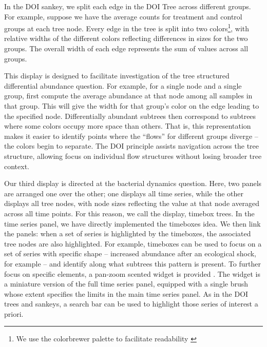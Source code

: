 \documentclass[12pt]{article}
\begin{document}
In the DOI sankey, we split each edge in the DOI Tree across different
groups. For example, suppose we have the average counts for treatment
and control groups at each tree node. Every edge in the tree is split
into two colors\footnote{We use the colorbrewer palette to facilitate
  readability \citep{brewer2003colorbrewer}}, with relative
widths of the different colors reflecting differences in sizes for the
two groups. The overall width of each edge represents the sum of values
across all groups.

This display is designed to facilitate investigation of the tree
structured differential abundance question. For example, for a single
node and a single group, first compute the average abundance at that
node among all samples in that group. This will give the width for that
group's color on the edge leading to the specified node. Differentially
abundant subtrees then correspond to subtrees where some colors occupy
more space than others. That is, this representation makes it easier to
identify points where the ``flows'' for different groups diverge -- the
colors begin to separate. The DOI principle assists navigation across
the tree structure, allowing focus on individual flow structures without
losing broader tree context.

Our third display is directed at the bacterial dynamics question. Here, two
panels are arranged one over the other; one displays all time series, while the
other displays all tree nodes, with node sizes reflecting the value at that node
averaged across all time points. For this reason, we call the display, timebox
trees. In the time series panel, we have directly implemented the timeboxes
idea. We then link the panels: when a set of series is highlighted by the
timeboxes, the associated tree nodes are also highlighted. For example,
timeboxes can be used to focus on a set of series with specific shape --
increased abundance after an ecological shock, for example -- and identify along
what subtrees this pattern is present. To further focus on specific elements, a
pan-zoom scented widget is provided \citep{willett2007scented}. The widget is a
miniature version of the full time series panel, equipped with a single brush
whose extent specifies the limits in the main time series panel. As in the DOI
trees and sankeys, a search bar can be used to highlight those series of
interest a priori.
\end{document}
